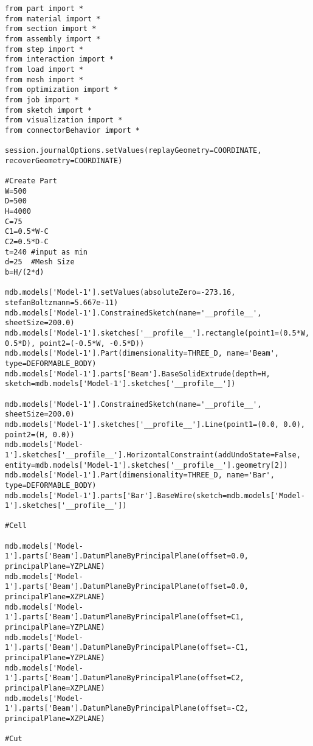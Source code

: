 \documentclass[12pt, letterpaper, oneside]{report}
\begin{document}
\lstset{numbers=left, language=python}
\begin{lstlisting}[frame=none]
from part import *
from material import *
from section import *
from assembly import *
from step import *
from interaction import *
from load import *
from mesh import *
from optimization import *
from job import *
from sketch import *
from visualization import *
from connectorBehavior import *

session.journalOptions.setValues(replayGeometry=COORDINATE, recoverGeometry=COORDINATE)

#Create Part
W=500
D=500
H=4000
C=75
C1=0.5*W-C
C2=0.5*D-C
t=240 #input as min
d=25  #Mesh Size
b=H/(2*d)

mdb.models['Model-1'].setValues(absoluteZero=-273.16, stefanBoltzmann=5.667e-11)
mdb.models['Model-1'].ConstrainedSketch(name='__profile__', sheetSize=200.0)
mdb.models['Model-1'].sketches['__profile__'].rectangle(point1=(0.5*W, 0.5*D), point2=(-0.5*W, -0.5*D))
mdb.models['Model-1'].Part(dimensionality=THREE_D, name='Beam', type=DEFORMABLE_BODY)
mdb.models['Model-1'].parts['Beam'].BaseSolidExtrude(depth=H, sketch=mdb.models['Model-1'].sketches['__profile__'])

mdb.models['Model-1'].ConstrainedSketch(name='__profile__', sheetSize=200.0)
mdb.models['Model-1'].sketches['__profile__'].Line(point1=(0.0, 0.0), point2=(H, 0.0))
mdb.models['Model-1'].sketches['__profile__'].HorizontalConstraint(addUndoState=False, entity=mdb.models['Model-1'].sketches['__profile__'].geometry[2])
mdb.models['Model-1'].Part(dimensionality=THREE_D, name='Bar', type=DEFORMABLE_BODY)
mdb.models['Model-1'].parts['Bar'].BaseWire(sketch=mdb.models['Model-1'].sketches['__profile__'])

#Cell

mdb.models['Model-1'].parts['Beam'].DatumPlaneByPrincipalPlane(offset=0.0, principalPlane=YZPLANE)
mdb.models['Model-1'].parts['Beam'].DatumPlaneByPrincipalPlane(offset=0.0, principalPlane=XZPLANE)
mdb.models['Model-1'].parts['Beam'].DatumPlaneByPrincipalPlane(offset=C1, principalPlane=YZPLANE)
mdb.models['Model-1'].parts['Beam'].DatumPlaneByPrincipalPlane(offset=-C1, principalPlane=YZPLANE)
mdb.models['Model-1'].parts['Beam'].DatumPlaneByPrincipalPlane(offset=C2, principalPlane=XZPLANE)
mdb.models['Model-1'].parts['Beam'].DatumPlaneByPrincipalPlane(offset=-C2, principalPlane=XZPLANE)

#Cut


\end{lstlisting}
\end{document}
